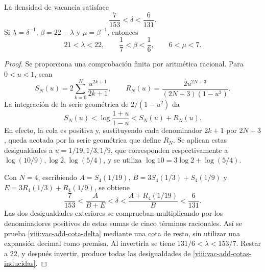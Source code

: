 \begin{lemma}
\label{viii:vac-add-cotas}
La densidad de vacancia satisface
\begin{equation}
 \frac7{153}<\delta<\frac6{131}.
 \label{viii:vac-add-cota-delta}
\end{equation}
Si \(\lambda=\delta^{-1}\), \(\beta=22-\lambda\) y
\(\mu=\beta^{-1}\), entonces
\begin{equation}
 21<\lambda<22,
 \qquad \frac17<\beta<\frac16,
 \qquad 6<\mu<7.
 \label{viii:vac-add-cotas-inducidas}
\end{equation}
\end{lemma}
\begin{proof}
Se proporciona una comprobación finita por aritmética racional. Para
\(0<u<1\), sean
\[
 S_N(u)=2\sum_{k=0}^{N}\frac{u^{2k+1}}{2k+1},
 \qquad
 R_N(u)=\frac{2u^{2N+3}}{(2N+3)(1-u^2)}.
\]
La integración de la serie geométrica de \(2/(1-u^2)\) da
\[
 S_N(u)<\log\frac{1+u}{1-u}<S_N(u)+R_N(u).
\]
En efecto, la cola es positiva y, sustituyendo cada denominador
\(2k+1\) por \(2N+3\), queda acotada por la serie geométrica que
define \(R_N\). Se aplican estas desigualdades a
\(u=1/19,1/3,1/9\), que corresponden respectivamente a
\(\log(10/9),\log2,\log(5/4)\), y se utiliza
\(\log10=3\log2+\log(5/4)\).

Con \(N=4\), escribiendo \(A=S_4(1/19)\),
\(B=3S_4(1/3)+S_4(1/9)\) y
\(E=3R_4(1/3)+R_4(1/9)\), se obtiene
\[
 \frac7{153}
 <\frac{A}{B+E}
 <\delta
 <\frac{A+R_4(1/19)}{B}
 <\frac6{131}.
\]
Las dos desigualdades exteriores se comprueban multiplicando por los
denominadores positivos de estas sumas de cinco términos racionales.
Así se prueba \eqref{viii:vac-add-cota-delta} mediante una cota de resto,
sin utilizar una expansión decimal como premisa. Al invertirla se tiene
\(131/6<\lambda<153/7\). Restar a \(22\), y después invertir,
produce todas las desigualdades de \eqref{viii:vac-add-cotas-inducidas}.
\end{proof}

